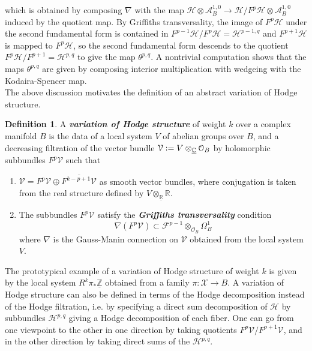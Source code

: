 \documentclass[psamsfonts, 12pt]{amsart}
\theoremstyle{definition}
\newtheorem{defn}[thm]{Definition}
\theoremstyle{remark}
\renewcommand{\O}{\mathcal{O}}
\newcommand{\R}{\mathbb{R}}
\newcommand{\ib}[1]{\textbf{\textit{#1}}}
\newcommand{\Z}{\mathbb{Z}}
\newcommand{\C}{\mathbb{C}}
\newcommand{\defeq}{\vcentcolon=}
\begin{document}
which is obtained by composing $\nabla$ with the map
$\mathcal{H} \otimes \mathcal{A}^{1,0}_B\to\mathcal{H}/F^p\mathcal{H}
\otimes \mathcal{A}^{1,0}_B$ induced by the quotient map. By Griffiths
transversality, the image of $F^p \mathcal{H}$ under the second fundamental form
is contained in $F^{p-1}\mathcal{H}/F^p\mathcal{H} = \mathcal{H}^{p-1,q}$
and $F^{p+1}\mathcal{H}$ is mapped to $F^p \mathcal{H}$, so the second fundamental
form descends to the quotient $F^p \mathcal{H}/F^{p+1} = \mathcal{H}^{p,q}$ to give
the map $\theta^{p,q}$. A nontrivial computation shows that the
maps $\theta^{p,q}$ are given by composing interior multiplication with
wedgeing with the Kodaira-Spencer map.\\

The above discussion motivates the definition of an abstract variation of
Hodge structure.
%
\begin{defn}
A \ib{variation of Hodge structure} of weight $k$ over a complex manifold $B$ is the
data of a local system $V$ of abelian groups over $B$, and a decreasing filtration
of the vector bundle $\mathcal{V} \defeq V \otimes_{\underline{\C}} \O_B$
by holomorphic subbundles $F^p\mathcal{V}$ such that
\begin{enumerate}
  \item $\mathcal{V} = F^p\mathcal{V} \oplus \overline{F^{k-p+1}\mathcal{V}}$
  as smooth vector bundles, where conjugation is taken from the real
  structure defined by $V \otimes_{\underline{\R}} \R$.
  \item The subbundles $F^p \mathcal{V}$ satisfy the \ib{Griffiths transversality}
  condition
  \[
  \nabla(F^p \mathcal{V}) \subset \mathcal{F}^{p-1}\otimes_{\O_B} \Omega^1_B
  \]
  where $\nabla$ is the Gauss-Manin connection on $\mathcal{V}$ obtained
  from the local system $V$.
\end{enumerate}
\end{defn}
%
The prototypical example of a variation of Hodge structure of weight $k$ is given by
the local system $R^k\pi_*\underline{\Z}$ obtained from a family
$\pi : \mathcal{X} \to B$. A variation of Hodge structure can also be
defined in terms of the Hodge decomposition instead of the Hodge filtration,
i.e. by specifying a direct sum decomposition of $\mathcal{H}$ by
subbundles $\mathcal{H}^{p,q}$ giving a Hodge decomposition of each fiber.
One can go from one viewpoint to the other in one direction by taking quotients
$F^p \mathcal{V}/F^{p+1} \mathcal{V}$, and in the other direction by taking
direct sums of the $\mathcal{H}^{p,q}$.\\
\end{document}
